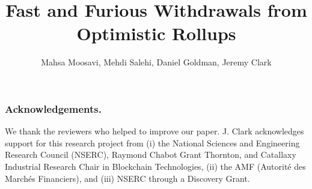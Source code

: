 \documentclass[runningheads]{llncs}
\begin{document}
\title{\Large \bf Fast and Furious Withdrawals from Optimistic Rollups}

\author{
	Mahsa Moosavi\inst{\dag\ddag},
	Mehdi Salehi\inst{\ddag},
	Daniel Goldman\inst{\ddag},
	Jeremy Clark\inst{\dag}
	}


\maketitle









\subsubsection*{Acknowledgements.} We thank the reviewers who helped to improve our paper. J. Clark acknowledges support for this research project from (i) the National Sciences and Engineering Research Council (NSERC), Raymond Chabot Grant Thornton, and Catallaxy Industrial Research Chair in Blockchain Technologies, (ii) the AMF (Autorité des Marchés Financiers), and (iii) NSERC through a Discovery Grant. 





\clearpage
\appendix
\end{document}
